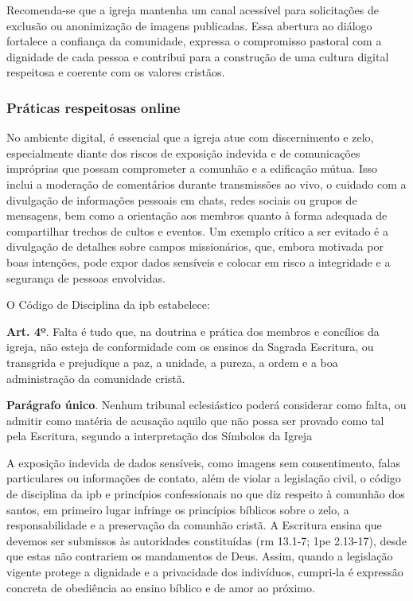 Recomenda-se que a igreja mantenha um canal acessível para solicitações de exclusão ou anonimização de imagens publicadas. Essa abertura ao diálogo fortalece a confiança da comunidade, expressa o compromisso pastoral com a dignidade de cada pessoa e contribui para a construção de uma cultura digital respeitosa e coerente com os valores cristãos.

\subsubsection{Práticas respeitosas online}

No ambiente digital, é essencial que a igreja atue com discernimento e zelo, especialmente diante dos riscos de exposição indevida e de comunicações impróprias que possam comprometer a comunhão e a edificação mútua. Isso inclui a moderação de comentários durante transmissões ao vivo, o cuidado com a divulgação de informações pessoais em chats, redes sociais ou grupos de mensagens, bem como a orientação aos membros quanto à forma adequada de compartilhar trechos de cultos e eventos. Um exemplo crítico a ser evitado é a divulgação de detalhes sobre campos missionários, que, embora motivada por boas intenções, pode expor dados sensíveis e colocar em risco a integridade e a segurança de pessoas envolvidas.

O Código de Disciplina da \gls{ipb} estabelece:

\begin{citacao}
    \textbf{Art. 4º}. Falta é tudo que, na doutrina e prática dos membros e concílios da igreja, não esteja de conformidade com os ensinos da Sagrada Escritura, ou transgrida e prejudique a paz, a unidade, a pureza, a ordem e a boa administração da comunidade cristã.

    \textbf{Parágrafo único}. Nenhum tribunal eclesiástico poderá considerar como falta, ou admitir como matéria de acusação aquilo que não possa ser provado como tal pela Escritura, segundo a interpretação dos Símbolos da Igreja \cite[art.~4]{ipb_codigodisciplina}
\end{citacao} 

A exposição indevida de dados sensíveis, como imagens sem consentimento, falas particulares ou informações de contato, além de violar a legislação civil, o código de disciplina da \gls{ipb} e princípios confessionais no que diz respeito à comunhão dos santos, em primeiro lugar infringe os princípios bíblicos sobre o zelo, a responsabilidade e a preservação da comunhão cristã. A Escritura ensina que devemos ser submissos às autoridades constituídas (\gls{rm} 13.1-7; \gls{1pe} 2.13-17), desde que estas não contrariem os mandamentos de Deus. Assim, quando a legislação vigente protege a dignidade e a privacidade dos indivíduos, cumpri-la é expressão concreta de obediência ao ensino bíblico e de amor ao próximo.

